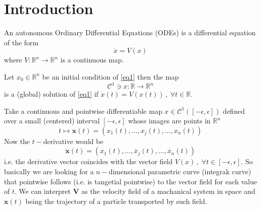 \documentclass[../main.tex]{subfiles}
\begin{document}
     \section{Introduction}\label{sec1}
     \begin{definition}\label{def1}
          An autonomous Ordinary Differential Equations (ODEs) is a differential equation of the form
          \begin{equation}\label{eq1}
                  \dot{x} = V(x)
          \end{equation}
          where $V:\mathbb{R}^{n}\to \mathbb{R}^{n}$ is a continuous map.
     \end{definition}
     \begin{definition}[]\label{def2}
          Let $x_0\in \mathbb{R}^{n}$ be an initial condition of \ref{eq1} then the map
          \begin{equation}\label{eq2}
               \mathcal{C}^{1}\ni x:\mathbb{R}\to \mathbb{R}^{n}
          \end{equation}
          is a (global) solution of \ref{eq1} if $\dot{x}(t) = V(x(t))\,,\;\forall t\in \mathbb{R}$.
     \end{definition}
     \begin{interpretation*}{}
             Take a continuous and pointwise differentiable map $x\in \mathcal{C}^{1}([-\epsilon,\epsilon])$ defined over a small (centered) interval $[-\epsilon,\epsilon]$ whose images are points in $\mathbb{R}^{n}$
             \begin{equation}\label{eq3}
                  t \mapsto \boldsymbol{x}(t) = (x_{1}(t), \dots, x_{j}(t), \dots, x_{n}(t))
             \end{equation}
             Now the $t-$derivative would be
             \begin{equation}\label{eq4}
                     \boldsymbol{\dot{x}}(t)= (\dot{x_{1}}(t),\dots, \dot{x_{j}}(t), \dots,\dot{x_{n}}(t))
             \end{equation}
             i.e. the derivative vector coincides with the vector field $V(x)\,,\;\forall t\in[-\epsilon,\epsilon]$. So basically we are looking for a $n-$dimensional parametric curve (integrak curve) that pointwise follows (i.e. is tangetial pointwise) to the vector field for each value of $t$. We can interpret $\boldsymbol{V}$ as the velocity field of a machanical system in space and $\boldsymbol{x}(t)$ being the trajectory of a particle transported by such field.
     \end{interpretation*}
\end{document}
